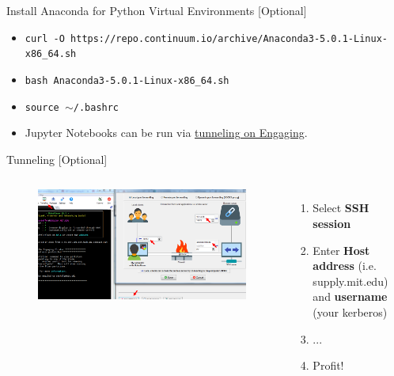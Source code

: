 \documentclass{beamer}
\begin{document}
\begin{frame}{Install Anaconda for Python Virtual Environments [Optional]}
    \begin{itemize}
        \item \texttt{curl -O https://repo.continuum.io/archive/Anaconda3-5.0.1-Linux-x86\_64.sh}
        \item \texttt{bash Anaconda3-5.0.1-Linux-x86\_64.sh}
        \item \texttt{source $\sim$/.bashrc}
        \item Jupyter Notebooks can be run via \href{https://wikis.mit.edu/confluence/display/sloanrc/Text+Editors+and+IDEs}{tunneling on Engaging}. 
    \end{itemize}
\end{frame}

\begin{frame}{Tunneling [Optional]}
    \begin{columns}[c]
    \begin{figure}
    \includegraphics[width=1.0\linewidth]{resources/02_mobaxterm.png}
    \end{figure}
        \begin{enumerate}
            \item Select \textbf{SSH session}
            \item Enter \textbf{Host address} (i.e. supply.mit.edu) and \textbf{username} (your kerberos)
            \item ...
            \item Profit!
        \end{enumerate}
\end{columns}
\end{frame}
\end{document}
